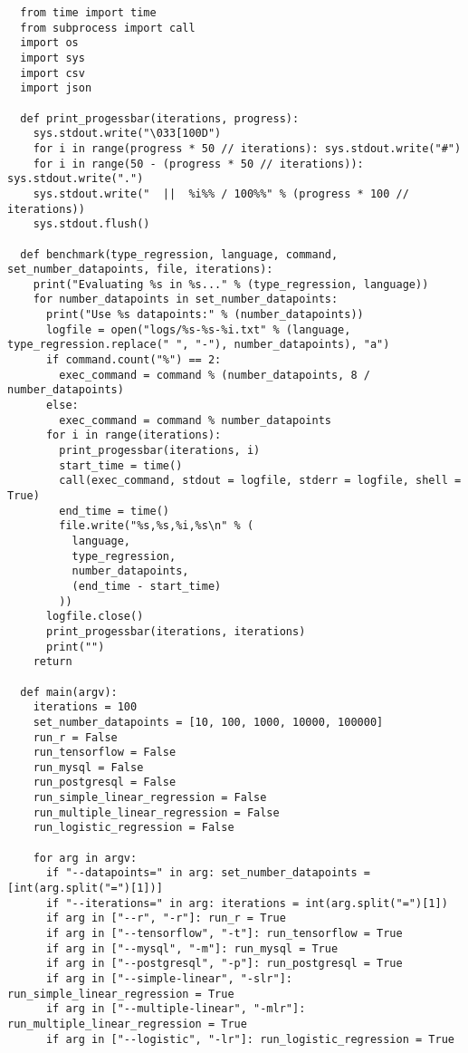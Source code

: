 \begin{verbatim}
  from time import time
  from subprocess import call
  import os
  import sys
  import csv
  import json

  def print_progessbar(iterations, progress):
    sys.stdout.write("\033[100D")
    for i in range(progress * 50 // iterations): sys.stdout.write("#")
    for i in range(50 - (progress * 50 // iterations)): sys.stdout.write(".")
    sys.stdout.write("  ||  %i%% / 100%%" % (progress * 100 // iterations))
    sys.stdout.flush()

  def benchmark(type_regression, language, command, set_number_datapoints, file, iterations):
    print("Evaluating %s in %s..." % (type_regression, language))
    for number_datapoints in set_number_datapoints:
      print("Use %s datapoints:" % (number_datapoints))
      logfile = open("logs/%s-%s-%i.txt" % (language, type_regression.replace(" ", "-"), number_datapoints), "a")
      if command.count("%") == 2:
        exec_command = command % (number_datapoints, 8 / number_datapoints)
      else:
        exec_command = command % number_datapoints
      for i in range(iterations):
        print_progessbar(iterations, i)
        start_time = time()
        call(exec_command, stdout = logfile, stderr = logfile, shell = True)
        end_time = time()
        file.write("%s,%s,%i,%s\n" % (
          language,
          type_regression,
          number_datapoints,
          (end_time - start_time)
        ))
      logfile.close()
      print_progessbar(iterations, iterations)
      print("")
    return

  def main(argv):
    iterations = 100
    set_number_datapoints = [10, 100, 1000, 10000, 100000]
    run_r = False
    run_tensorflow = False
    run_mysql = False
    run_postgresql = False
    run_simple_linear_regression = False
    run_multiple_linear_regression = False
    run_logistic_regression = False

    for arg in argv:
      if "--datapoints=" in arg: set_number_datapoints = [int(arg.split("=")[1])]
      if "--iterations=" in arg: iterations = int(arg.split("=")[1])
      if arg in ["--r", "-r"]: run_r = True
      if arg in ["--tensorflow", "-t"]: run_tensorflow = True
      if arg in ["--mysql", "-m"]: run_mysql = True
      if arg in ["--postgresql", "-p"]: run_postgresql = True
      if arg in ["--simple-linear", "-slr"]: run_simple_linear_regression = True
      if arg in ["--multiple-linear", "-mlr"]: run_multiple_linear_regression = True
      if arg in ["--logistic", "-lr"]: run_logistic_regression = True


\end{verbatim}
